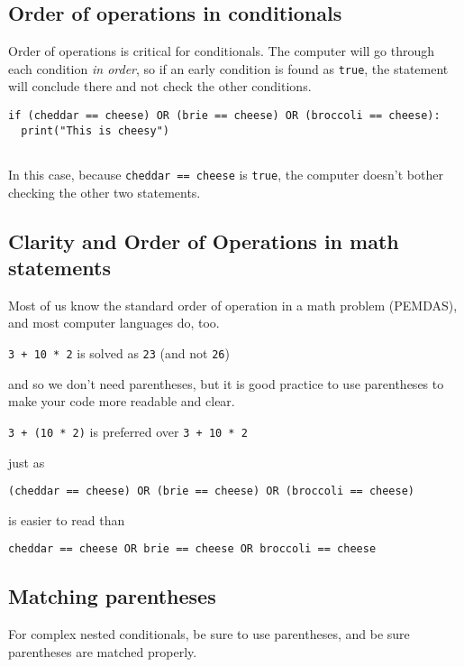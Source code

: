 \documentclass[
]{book}
\begin{document}
\subsection{Order of operations in conditionals}\label{order-of-operations-in-conditionals}

Order of operations is critical for conditionals. The computer will go through each condition \emph{in order}, so if an early condition is found as \texttt{true}, the statement will conclude there and not check the other conditions.

\begin{verbatim}
if (cheddar == cheese) OR (brie == cheese) OR (broccoli == cheese):
  print("This is cheesy")
  
\end{verbatim}

In this case, because \texttt{cheddar\ ==\ cheese} is \texttt{true}, the computer doesn't bother checking the other two statements.

\subsection{Clarity and Order of Operations in math statements}\label{clarity-and-order-of-operations-in-math-statements}

Most of us know the standard order of operation in a math problem (PEMDAS), and most computer languages do, too.

\texttt{3\ +\ 10\ *\ 2} is solved as \texttt{23} (and not \texttt{26})

and so we don't need parentheses, but it is good practice to use parentheses to make your code more readable and clear.

\texttt{3\ +\ (10\ *\ 2)} is preferred over \texttt{3\ +\ 10\ *\ 2}

just as

\texttt{(cheddar\ ==\ cheese)\ OR\ (brie\ ==\ cheese)\ OR\ (broccoli\ ==\ cheese)}

is easier to read than

\texttt{cheddar\ ==\ cheese\ OR\ brie\ ==\ cheese\ OR\ broccoli\ ==\ cheese}

\subsection{Matching parentheses}\label{matching-parentheses}

For complex nested conditionals, be sure to use parentheses, and be sure parentheses are matched properly.
\end{document}
